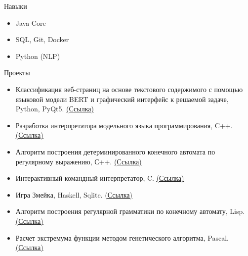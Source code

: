 \documentclass{resume} %
\begin{document}
\begin{rSection}{Навыки}
\begin{itemize}
  \item Java Core
  \item SQL, Git, Docker
  \item Python (NLP)
\end{itemize}
\end{rSection}



\begin{rSection}{Проекты}
\begin{itemize}
\item {Классификация веб-страниц на основе текстового содержимого с помощью языковой модели BERT и графический интерфейс к решаемой задаче, Python, PyQt5. \href{https://github.com/tymillnyc/diploma} {\underline {(Ссылка)}}}
\item {Разработка интерпретатора модельного языка программирования, C++. \href{https://github.com/tymillnyc/PLInterpreter} {\underline {(Ссылка)}}}
\item {Алгоритм построения детерминированного конечного автомата по регулярному выражению, С++. \href{https://github.com/tymillnyc/re2dfa} {\underline {(Ссылка)}}} 
\item {Интерактивный командный интерпретатор, C. \href{https://github.com/tymillnyc/myshell} {\underline {(Ссылка)}}} 
\item {Игра \textquotedbl{}Змейка\textquotedbl{}, Haskell, Sqlite. \href{https://github.com/tymillnyc/chervyak} {\underline {(Ссылка)}}} 
\item {Алгоритм построения регулярной грамматики по конечному автомату, Lisp. \href{https://github.com/tymillnyc?tab=repositories} {\underline {(Ссылка)}}} 
\item {Расчет экстремума функции методом генетического алгоритма, Pascal. \href{https://github.com/tymillnyc/GeneticAlgorithm} {\underline {(Ссылка)}}} 
\end{itemize}
\end{rSection} 





\end{document}
